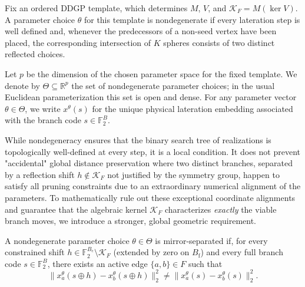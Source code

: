 \begin{definition}
\label{def:nondegenerate-params}
Fix an ordered DDGP template, which determines $M$, $V$, and $\mathcal{K}_F = M(\ker V)$. A parameter choice $\theta$ for this template is nondegenerate if every lateration step is well defined and, whenever the predecessors of a non-seed vertex have been placed, the corresponding intersection of $K$ spheres consists of two distinct reflected choices. 
\end{definition}

Let $p$ be the dimension of the chosen parameter space for the fixed template. We denote by $\Theta \subseteq \mathbb{R}^p$ the set of nondegenerate parameter choices; in the usual Euclidean parameterization this set is open and dense. For any parameter vector $\theta \in \Theta$, we write $x^\theta(s)$ for the unique physical lateration embedding associated with the branch code $s \in \mathbb{F}_2^B$.

While nondegeneracy ensures that the binary search tree of realizations is topologically well-defined at every step, it is a local condition. It does not prevent "accidental" global distance preservation where two distinct branches, separated by a reflection shift $h \notin \mathcal{K}_F$ not justified by the symmetry group, happen to satisfy all pruning constraints due to an extraordinary numerical alignment of the parameters. To mathematically rule out these exceptional coordinate alignments and guarantee that the algebraic kernel $\mathcal{K}_F$ characterizes \emph{exactly} the viable branch moves, we introduce a stronger, global geometric requirement.

\begin{definition}
\label{def:mirror-sep}
A nondegenerate parameter choice $\theta \in \Theta$ is mirror-separated if, for every constrained shift $h\in\mathbb{F}_2^{B_{\mathrm{c}}}\setminus\mathcal{K}_F$ (extended by zero on $B_{\mathrm{f}}$) and every full branch code $s\in\mathbb{F}_2^B$, there exists an active edge $\{a,b\} \in F$ such that
\[
\|x^\theta_a(s \oplus h) - x^\theta_b(s \oplus h)\|_2^2 \neq \|x^\theta_a(s) - x^\theta_b(s)\|_2^2.
\]
\end{definition}

